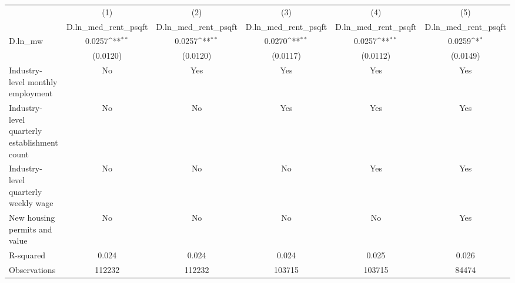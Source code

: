 {
\def\sym#1{\ifmmode^{#1}\else\(^{#1}\)\fi}
\begin{tabular}{l*{5}{c}}
\hline\hline
          &\multicolumn{1}{c}{(1)}&\multicolumn{1}{c}{(2)}&\multicolumn{1}{c}{(3)}&\multicolumn{1}{c}{(4)}&\multicolumn{1}{c}{(5)}\\
          &\multicolumn{1}{c}{D.ln\_med\_rent\_psqft}&\multicolumn{1}{c}{D.ln\_med\_rent\_psqft}&\multicolumn{1}{c}{D.ln\_med\_rent\_psqft}&\multicolumn{1}{c}{D.ln\_med\_rent\_psqft}&\multicolumn{1}{c}{D.ln\_med\_rent\_psqft}\\
\hline
D.ln\_mw   &   0.0257\sym{**} &   0.0257\sym{**} &   0.0270\sym{**} &   0.0257\sym{**} &   0.0259\sym{*}  \\
          & (0.0120)         & (0.0120)         & (0.0117)         & (0.0112)         & (0.0149)         \\
\hline
Industry-level monthly employment&       No         &      Yes         &      Yes         &      Yes         &      Yes         \\
Industry-level quarterly establishment count&       No         &       No         &      Yes         &      Yes         &      Yes         \\
Industry-level quarterly weekly wage&       No         &       No         &       No         &      Yes         &      Yes         \\
New housing permits and value&       No         &       No         &       No         &       No         &      Yes         \\
R-squared &    0.024         &    0.024         &    0.024         &    0.025         &    0.026         \\
Observations&   112232         &   112232         &   103715         &   103715         &    84474         \\
\hline\hline
\end{tabular}
}
